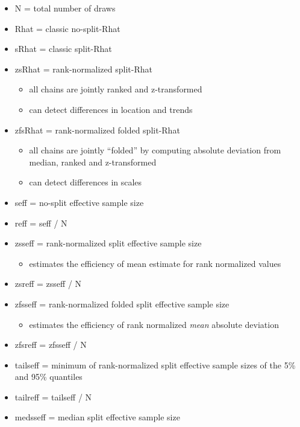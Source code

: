 \documentclass[american,]{article}
\providecommand{\tightlist}{%
  \setlength{\itemsep}{0pt}\setlength{\parskip}{0pt}}
\begin{document}
\begin{itemize}
\tightlist
\item
  N = total number of draws
\item
  Rhat = classic no-split-Rhat
\item
  sRhat = classic split-Rhat
\item
  zsRhat = rank-normalized split-Rhat

  \begin{itemize}
  \tightlist
  \item
    all chains are jointly ranked and z-transformed
  \item
    can detect differences in location and trends
  \end{itemize}
\item
  zfsRhat = rank-normalized folded split-Rhat

  \begin{itemize}
  \tightlist
  \item
    all chains are jointly ``folded'' by computing absolute deviation
    from median, ranked and z-transformed
  \item
    can detect differences in scales
  \end{itemize}
\item
  seff = no-split effective sample size
\item
  reff = seff / N
\item
  zsseff = rank-normalized split effective sample size

  \begin{itemize}
  \tightlist
  \item
    estimates the efficiency of mean estimate for rank normalized values
  \end{itemize}
\item
  zsreff = zsseff / N
\item
  zfsseff = rank-normalized folded split effective sample size

  \begin{itemize}
  \tightlist
  \item
    estimates the efficiency of rank normalized \emph{mean} absolute
    deviation
  \end{itemize}
\item
  zfsreff = zfsseff / N
\item
  tailseff = minimum of rank-normalized split effective sample sizes of
  the 5\% and 95\% quantiles
\item
  tailreff = tailseff / N
\item
  medsseff = median split effective sample size


\end{itemize}
\end{document}
